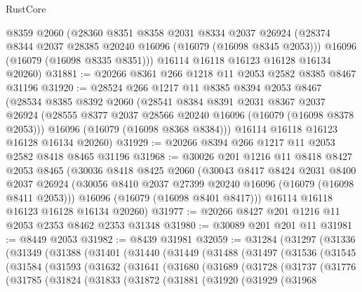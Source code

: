 \begin{lexlean}{RustCore}
\begin{coremodule}
      @8359
      @2060
      (@28360
        @8351
        @8358
        @2031
        @8334
        @2037
        @26924
        (@28374 @8344 @2037 @28385 @20240 @16096 (@16079 (@16098 @8345 @2053)))
        @16096
        (@16079 (@16098 @8335 @8351)))
      @16114
      @16118
      @16123
      @16128
      @16134
      @20260)
@31881 := @20266 @8361 @266 @1218 @11 @2053 @2582 @8385 @8467 @31196
@31920 := @28524
    @266
    @1217
    @11
    @8385
    @8394
    @2053
    @8467
    (@28534
      @8385
      @8392
      @2060
      (@28541
        @8384
        @8391
        @2031
        @8367
        @2037
        @26924
        (@28555 @8377 @2037 @28566 @20240 @16096 (@16079 (@16098 @8378 @2053)))
        @16096
        (@16079 (@16098 @8368 @8384)))
      @16114
      @16118
      @16123
      @16128
      @16134
      @20260)
@31929 := @20266 @8394 @266 @1217 @11 @2053 @2582 @8418 @8465 @31196
@31968 := @30026
    @201
    @1216
    @11
    @8418
    @8427
    @2053
    @8465
    (@30036
      @8418
      @8425
      @2060
      (@30043
        @8417
        @8424
        @2031
        @8400
        @2037
        @26924
        (@30056 @8410 @2037 @27399 @20240 @16096 (@16079 (@16098 @8411 @2053)))
        @16096
        (@16079 (@16098 @8401 @8417)))
      @16114
      @16118
      @16123
      @16128
      @16134
      @20260)
@31977 := @20266 @8427 @201 @1216 @11 @2053 @2353 @8462 @2353 @31348
@31980 := @30089 @201 @201 @11
@31981 := @8449 @2053
@31982 := @8439 @31981
@32059 := @31284
    (@31297
      (@31336
        (@31349
          (@31388
            (@31401
              (@31440
                (@31449
                  (@31488
                    (@31497
                      (@31536
                        (@31545
                          (@31584
                            (@31593
                              (@31632
                                (@31641
                                  (@31680
                                    (@31689
                                      (@31728
                                        (@31737
                                          (@31776
                                            (@31785
                                              (@31824
                                                (@31833
                                                  (@31872
                                                    (@31881
                                                      (@31920
                                                        (@31929
                                                          (@31968

\end{coremodule}
\end{lexlean}
